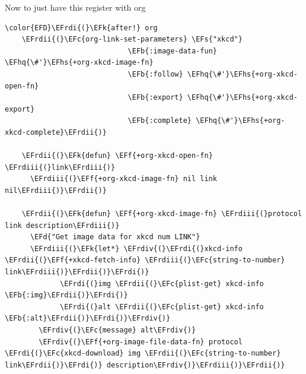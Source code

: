 \documentclass{scrartcl}
\newcommand{\EFk}[1]{\textcolor{EFk}{#1}} %
\newcommand{\EFd}[1]{\textcolor{EFd}{#1}} %
\newcommand{\EFs}[1]{\textcolor{EFs}{#1}} %
\newcommand{\EFb}[1]{\textcolor{EFb}{#1}} %
\newcommand{\EFc}[1]{\textcolor{EFc}{#1}} %
\newcommand{\EFf}[1]{\textcolor{EFf}{#1}} %
\newcommand{\EFhq}[1]{#1} %
\newcommand{\EFhs}[1]{#1} %
\newcommand{\EFrdi}[1]{#1} %
\newcommand{\EFrdii}[1]{#1} %
\newcommand{\EFrdiii}[1]{#1} %
\newcommand{\EFrdiv}[1]{#1} %
\begin{document}
Now to just have this register with org
\begin{Code}
\begin{Verbatim}[]
\color{EFD}\EFrdi{(}\EFk{after!} org
	\EFrdii{(}\EFc{org-link-set-parameters} \EFs{"xkcd"}
	                         \EFb{:image-data-fun} \EFhq{\#'}\EFhs{+org-xkcd-image-fn}
	                         \EFb{:follow} \EFhq{\#'}\EFhs{+org-xkcd-open-fn}
	                         \EFb{:export} \EFhq{\#'}\EFhs{+org-xkcd-export}
	                         \EFb{:complete} \EFhq{\#'}\EFhs{+org-xkcd-complete}\EFrdii{)}
	
	\EFrdii{(}\EFk{defun} \EFf{+org-xkcd-open-fn} \EFrdiii{(}link\EFrdiii{)}
	  \EFrdiii{(}\EFf{+org-xkcd-image-fn} nil link nil\EFrdiii{)}\EFrdii{)}
	
	\EFrdii{(}\EFk{defun} \EFf{+org-xkcd-image-fn} \EFrdiii{(}protocol link description\EFrdiii{)}
	  \EFd{"Get image data for xkcd num LINK"}
	  \EFrdiii{(}\EFk{let*} \EFrdiv{(}\EFrdi{(}xkcd-info \EFrdii{(}\EFf{+xkcd-fetch-info} \EFrdiii{(}\EFc{string-to-number} link\EFrdiii{)}\EFrdii{)}\EFrdi{)}
	         \EFrdi{(}img \EFrdii{(}\EFc{plist-get} xkcd-info \EFb{:img}\EFrdii{)}\EFrdi{)}
	         \EFrdi{(}alt \EFrdii{(}\EFc{plist-get} xkcd-info \EFb{:alt}\EFrdii{)}\EFrdi{)}\EFrdiv{)}
	    \EFrdiv{(}\EFc{message} alt\EFrdiv{)}
	    \EFrdiv{(}\EFf{+org-image-file-data-fn} protocol \EFrdi{(}\EFc{xkcd-download} img \EFrdii{(}\EFc{string-to-number} link\EFrdii{)}\EFrdi{)} description\EFrdiv{)}\EFrdiii{)}\EFrdii{)}
	

\end{Verbatim}
\end{Code}
\end{document}
